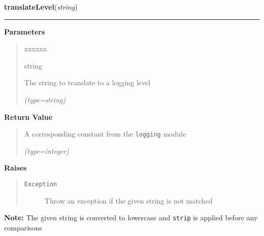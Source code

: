 \hspace{.8\funcindent}\begin{boxedminipage}{\funcwidth}

    \raggedright \textbf{translateLevel}(\textit{string})

    \vspace{-1.5ex}

    \rule{\textwidth}{0.5\fboxrule}
\setlength{\parskip}{2ex}
\setlength{\parskip}{1ex}
      \textbf{Parameters}
      \vspace{-1ex}

      \begin{quote}
        \begin{Ventry}{xxxxxx}

          \item[string]

          The string to translate to a logging level

            {\it (type=string)}

        \end{Ventry}

      \end{quote}

      \textbf{Return Value}
    \vspace{-1ex}

      \begin{quote}
      A corresponding constant from the \texttt{logging} module

      {\it (type=integer)}

      \end{quote}

      \textbf{Raises}
    \vspace{-1ex}

      \begin{quote}
        \begin{description}

          \item[\texttt{Exception}]

          Throw an exception if the given string is not matched

        \end{description}

      \end{quote}

\textbf{Note:} The given string is converted to lowercase and \texttt{strip} is applied 
before any comparisons



    \end{boxedminipage}


